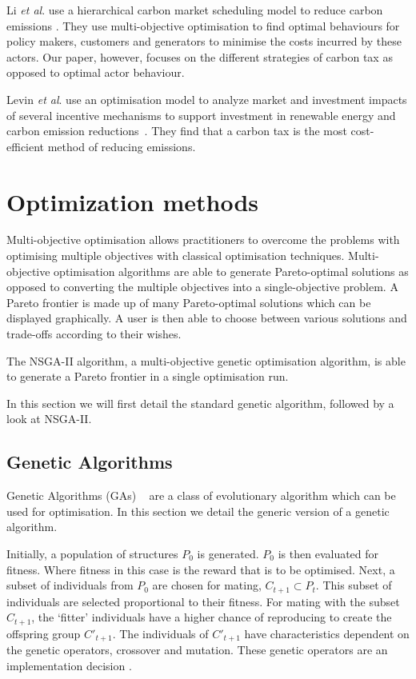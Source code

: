 \documentclass[sigconf]{acmart}
\begin{document}
Li \textit{et al}. use a hierarchical carbon market scheduling model to reduce carbon emissions \cite{Li2017}. They use multi-objective optimisation to find optimal behaviours for policy makers, customers and generators to minimise the costs incurred by these actors. Our paper, however, focuses on the different strategies of carbon tax as opposed to optimal actor behaviour.

Levin \textit{et al}. use an optimisation model to analyze market and investment impacts of several incentive mechanisms to support investment in renewable energy and carbon emission reductions~\cite{Levin2019}. They find that a carbon tax is the most cost-efficient method of reducing emissions.


\section{Optimization methods}
\label{sec:optimization_methods}

Multi-objective optimisation allows practitioners to overcome the problems with optimising multiple objectives with classical optimisation techniques. Multi-objective optimisation algorithms are able to generate Pareto-optimal solutions as opposed to converting the multiple objectives into a single-objective problem. A Pareto frontier is made up of many Pareto-optimal solutions which can be displayed graphically. A user is then able to choose between various solutions and trade-offs according to their wishes.

The NSGA-II algorithm, a multi-objective genetic optimisation algorithm, is able to generate a Pareto frontier in a single optimisation run. 

In this section we will first detail the standard genetic algorithm, followed by a look at NSGA-II.

\subsection{Genetic Algorithms}

Genetic Algorithms (GAs) ~\cite{Holland1975} are a class of evolutionary algorithm which can be used for optimisation. In this section we detail the generic version of a genetic algorithm.

Initially, a population of structures $P_{0}$ is generated. $P_{0}$ is then evaluated for fitness. Where fitness in this case is the reward that is to be optimised. Next, a subset of individuals from $P_{0}$ are chosen for mating, $C_{t+1} \subset P_{t}$. This subset of individuals are selected proportional to their fitness. For mating with the subset $C_{t+1}$, the `fitter' individuals have a higher chance of reproducing to create the offspring group $C'_{t+1}$. The individuals of $C'_{t+1}$ have characteristics dependent on the genetic operators, crossover and mutation. These genetic operators are an implementation decision \cite{FogelDavidB2009}. 
\end{document}
